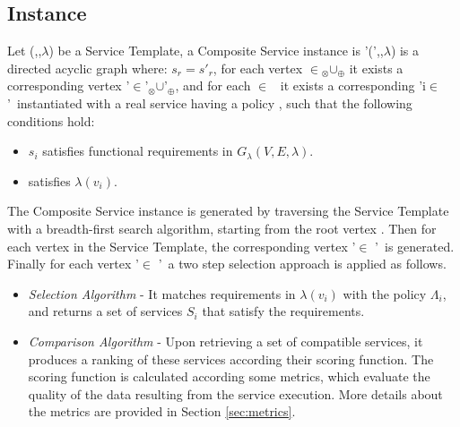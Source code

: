 
\subsection{Instance}


Let \T(\V,\E,$\lambda$) be a Service Template, a Composite Service instance is \T'(\V',\E,$\lambda$) is a directed acyclic graph where:
$s_r=s'_r$, for each vertex \vi{}$\in$\V$_{\otimes}$$\cup$\V$_{\oplus}$ it exists a corresponding vertex \vi{}'$\in$\V'$_{\otimes}$$\cup$\V'$_{\oplus}$,
    and for each $\in$ \V\ it exists a corresponding \vi'{i}$\in$ \V'\ instantiated with a real service  having a policy , such that the following conditions hold:
    \begin{itemize}
      \item $s_i$ satisfies functional requirements in $G_{\lambda}(V,E,\lambda)$.
      \item {} satisfies $\lambda(v_i)$.
    \end{itemize}

    The Composite Service  instance  is generated by traversing the Service Template with a breadth-first search algorithm,
    starting from the root vertex . Then for each vertex  in the Service Template, the corresponding vertex '$\in$ \V'\ is generated.
    Finally for each vertex  '$\in$ \V'\ a two step selection approach is applied as follows.
\begin{itemize}
  \item \textit{Selection Algorithm} - It matches requirements in $\lambda(v_i)$ with the policy $\Lambda_i$, and returns a set of services $S_i$ that satisfy the requirements.
  \item \textit{Comparison Algorithm} - Upon retrieving a set of compatible services, it produces a ranking of these services according their scoring function.
        The scoring function is calculated according some metrics, which evaluate the quality of the data resulting from the service execution. More details about the metrics are provided in Section \ref{sec:metrics}.
\end{itemize}


